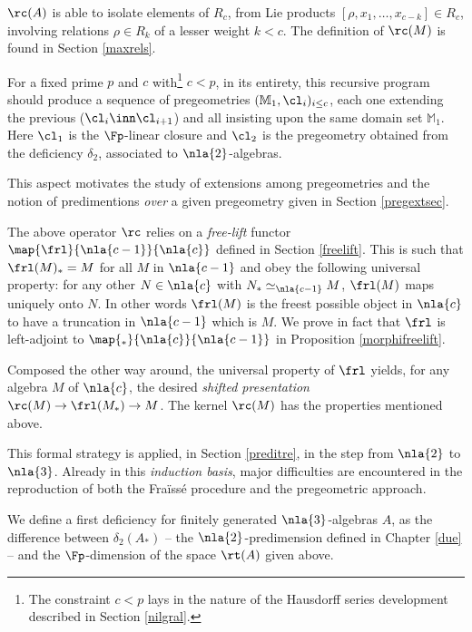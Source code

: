 $\rc(A)$ is able to isolate elements of $R_{c}$,
from Lie products $[\rho,x_{1},\dots,x_{c-k}]\in R_{c}$, involving relations $\rho\in R_{k}$ of a lesser weight $k<c$.
The definition of $\rc(M)$ is found in Section \ref{maxrels}.

\smallskip
For a fixed prime $p$ and $c$ with\footnote{
The constraint $c<p$ lays in the nature of the Hausdorff series development described in Section \ref{nilgral}.
} $c<p$, in its entirety, this recursive program should produce a sequence of pregeometries
$(\mathbb{M}_{1},\cl_{i})_{i\leq c}$, each one extending the previous ($\cl_{i}\inn\cl_{i+1}$) and all insisting upon the 
same domain set $\mathbb{M}_{1}$. Here $\cl_{1}$ is the $\Fp$-linear closure and $\cl_{2}$ is the pregeometry obtained
from the deficiency $\delta_{2}$, associated to $\nla{2}$-algebras.

This aspect motivates the study of extensions among pregeometries and the notion of predimentions {\em over} a given pregeometry
given in Section \ref{pregextsec}.

\medskip
The above operator $\rc$ relies on a {\em free-lift} functor $\map{\frl}{\nla{c-1}}{\nla{c}}$
defined in Section \ref{freelift}. This is such that $\frl(M)_{*}=M$ for all $M$ in $\nla{c-1}$ and obey the following universal property:
for any other $N\in\nla{c}$ with $N_{*}\simeq_{\nla{c-1}}M$, $\frl(M)$ maps uniquely onto $N$. In other words $\frl(M)$ is the freest possible
object in $\nla{c}$ to have a truncation in $\nla{c-1}$ which is $M$. We prove in fact that $\frl$ is left-adjoint to $\map{_{*}}{\nla{c}}
{\nla{c-1}}$ in Proposition \ref{morphifreelift}.

Composed the other way around, the universal property of $\frl$ yields, for any algebra $M$ of $\nla{c}$, the desired {\em shifted presentation} $\rc(M)\to\frl(M_{*})\to M$. The kernel $\rc(M)$ has the properties mentioned above.

\medskip
This formal strategy is applied, in Section \ref{preditre}, in the step from $\nla{2}$ to $\nla{3}$. Already in this {\em induction
basis}, major difficulties are encountered in the reproduction of both the Fra\"iss\'e procedure and the pregeometric approach.

We define a first deficiency for finitely generated $\nla{3}$-algebras $A$, as the difference between $\delta_{2}(A_{*})$
-- the $\nla{2}$-predimension defined in Chapter \ref{due} -- and the $\Fp$-dimension of the space $\rt(A)$ given above.

